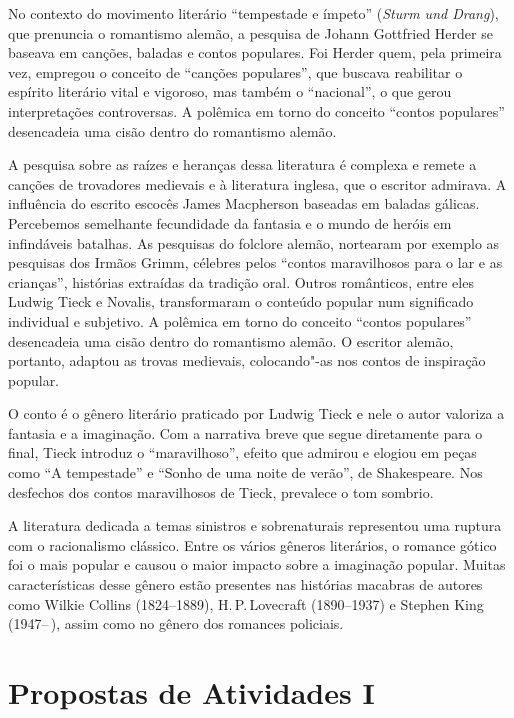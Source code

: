 \documentclass[12pt]{extarticle}
\begin{document}
No contexto do movimento literário ``tempestade e ímpeto'' (\textit{Sturm und Drang}), que prenuncia o romantismo alemão, a pesquisa de Johann Gottfried Herder se baseava em canções, baladas e contos populares. Foi Herder quem, 
pela primeira vez, empregou o conceito de ``canções populares'', que 
buscava reabilitar o espírito literário vital e vigoroso, mas também o ``nacional'', 
o que gerou interpretações controversas. A polêmica em torno do conceito ``contos populares'' 
desencadeia uma cisão dentro do romantismo alemão. 

A pesquisa sobre as raízes e heranças dessa literatura é complexa e remete a canções de trovadores medievais e à literatura inglesa, que o escritor admirava. 
A influência do escrito escocês James Macpherson baseadas em baladas gálicas.
Percebemos semelhante fecundidade da fantasia e o mundo de heróis em infindáveis batalhas.
As pesquisas do folclore alemão, nortearam  por exemplo as pesquisas dos Irmãos Grimm, célebres pelos ``contos maravilhosos para o lar e as crianças'', histórias extraídas da tradição oral. 
Outros românticos, entre eles Ludwig Tieck e Novalis, transformaram o conteúdo popular num significado individual e subjetivo. 
A polêmica em torno do conceito ``contos populares'' desencadeia uma cisão dentro do romantismo alemão. 
O escritor alemão, portanto, adaptou as trovas medievais, colocando"-as nos contos de inspiração popular.

O conto é o gênero literário praticado por Ludwig Tieck e nele o autor valoriza a fantasia e a imaginação.
Com a narrativa breve que segue diretamente para o final, Tieck introduz o ``maravilhoso'', efeito que 
admirou e elogiou em peças como ``A tempestade'' e ``Sonho de uma noite de verão'', de Shakespeare. 
Nos desfechos dos contos maravilhosos de Tieck, prevalece o tom sombrio.

A literatura dedicada a temas sinistros e sobrenaturais representou uma ruptura com o racionalismo clássico. 
Entre os vários gêneros literários, o romance gótico foi o mais popular e causou o maior impacto sobre a imaginação popular. Muitas características desse gênero estão presentes nas histórias macabras de autores como 
Wilkie Collins (1824--1889), H.\,P.\,Lovecraft (1890--1937) e Stephen King (1947--\,), 
assim como no gênero dos romances policiais. 


\section{Propostas de Atividades I}
\end{document}
